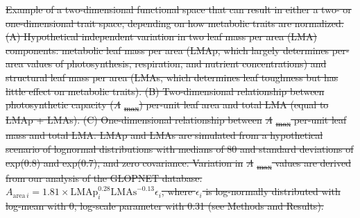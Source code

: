 \documentclass[
  12pt,
  letterpaper, %
  DIV=11, %
  numbers=noendperiod]{scrartcl} %
\providecommand{\DIFdeltex}[1]{{\protect\color{red}\sout{#1}}}                      %
\providecommand{\DIFdelFL}[1]{\DIFdel{#1}} %
\providecommand{\DIFdelbeginFL}{} %
\providecommand{\DIFdel}[1]{\texorpdfstring{\DIFdeltex{#1}}{}} %
\newcommand{\DIFscaledelfig}{0.5}
\newlength{\DIFdelgraphicswidth} %
\newlength{\DIFdelgraphicsheight} %
\newcommand{\DIFdelincludegraphics}[2][]{%
\sbox{\DIFdelgraphicsbox}{\DIFOincludegraphics[#1]{#2}}%
\settoboxwidth{\DIFdelgraphicswidth}{\DIFdelgraphicsbox} %
\settoboxtotalheight{\DIFdelgraphicsheight}{\DIFdelgraphicsbox} %
\scalebox{\DIFscaledelfig}{%
\parbox[b]{\DIFdelgraphicswidth}{\usebox{\DIFdelgraphicsbox}\\[-\baselineskip] \rule{\DIFdelgraphicswidth}{0em}}\llap{\resizebox{\DIFdelgraphicswidth}{\DIFdelgraphicsheight}{%
\setlength{\unitlength}{\DIFdelgraphicswidth}%
\begin{picture}(1,1)%
\thicklines\linethickness{2pt} %
{\color[rgb]{1,0,0}\put(0,0){\framebox(1,1){}}}%
{\color[rgb]{1,0,0}\put(0,0){\line( 1,1){1}}}%
{\color[rgb]{1,0,0}\put(0,1){\line(1,-1){1}}}%
\end{picture}%
}\hspace*{3pt}}} %
} %
\DeclareRobustCommand{\DIFdelbeginFL}{\DIFOdelbeginFL \let\includegraphics\DIFdelincludegraphics} %
\begin{document}
\DIFdelbeginFL %
{%
\DIFdelFL{Example of a two-dimensional functional space
that can result in either a two- or one-dimensional trait space,
depending on how metabolic traits are normalized. (A) Hypothetical
independent variation in two leaf mass per area (LMA) components:
metabolic leaf mass per area (LMAp, which largely determines per-area
values of photosynthesis, respiration, and nutrient concentrations) and
structural leaf mass per area (LMAs, which determines leaf toughness but
has little effect on metabolic traits). (B) Two-dimensional relationship
between photosynthetic capacity (}\emph{\DIFdelFL{A}}%
\DIFdelFL{\textsubscript{max}) per-unit
leaf area and total LMA (equal to LMAp + LMAs). (C) One-dimensional
relationship between }\emph{\DIFdelFL{A}}%
\DIFdelFL{\textsubscript{max} per-unit leaf mass and
total LMA. LMAp and LMAs are simulated from a hypothetical scenario of
lognormal distributions with medians of 80 and standard deviations of
exp(0.8) and exp(0.7), and zero covariance. Variation in
}\emph{\DIFdelFL{A}}%
\DIFdelFL{\textsubscript{max} values are derived from our analysis of the
GLOPNET database.
\(A_{\mathrm{area} \, i}=1.81 \times \mathrm{LMAp}_i^{0.28}\mathrm{LMAs}^{-0.13}\epsilon_i\),
where \(\epsilon_i\) is log-normally distributed with log-mean with 0,
log-scale parameter with 0.31 (see Methods and Results).}}

\end{document}
